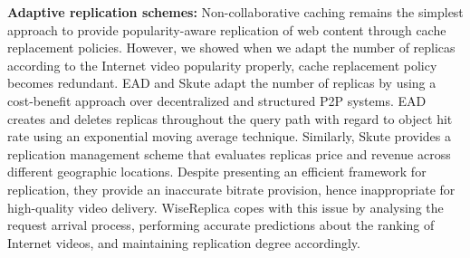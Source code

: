 \noindent
\textbf{Adaptive replication schemes:} Non-collaborative caching remains the simplest approach to provide popularity-aware replication of web content through cache replacement policies\cite{popularity_awaregreedydual_size_icdcs99}. However, we showed when we adapt the number of replicas according to the Internet video popularity properly, cache replacement policy becomes redundant. EAD \cite{Haiying_Shen_P2P_2010}
and Skute \cite{self_tolerant_acm_cloud_2010} adapt the number of replicas by
using a cost-benefit approach over decentralized and structured P2P
systems. EAD creates and deletes replicas throughout the query path
with regard to object hit rate using an exponential moving average
technique. Similarly, Skute provides a replication management scheme that
evaluates replicas price and revenue across different geographic
locations. Despite presenting an
efficient framework for replication, they provide an inaccurate bitrate provision, hence
inappropriate for high-quality video delivery. WiseReplica copes with this issue by analysing the request arrival process, performing accurate predictions about the ranking of Internet videos, and maintaining replication degree accordingly.
